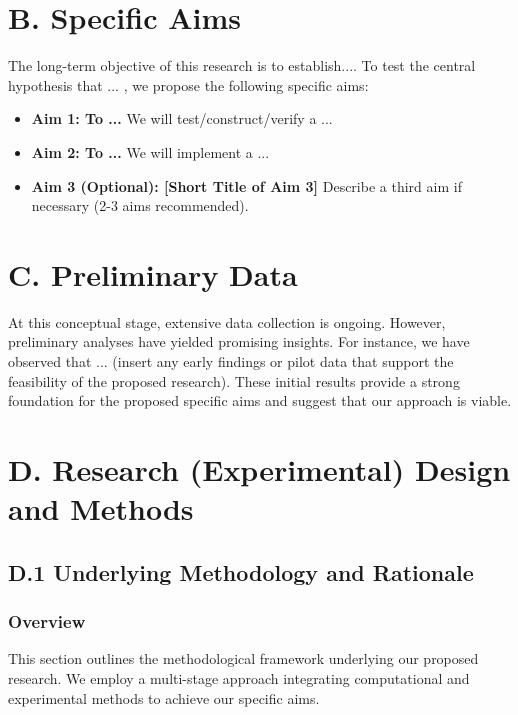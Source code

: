 \documentclass[12pt, a4paper]{article}
\begin{document}
\section*{B. Specific Aims}

The long-term objective of this research is to establish.... To test the central hypothesis that ... , we propose the following specific aims:

\begin{itemize}[leftmargin=*]
    \item \textbf{Aim 1: To ...} We will test/construct/verify a ...
    \item \textbf{Aim 2: To ...} We will implement a ...
    \item \textbf{Aim 3 (Optional): [Short Title of Aim 3]} Describe a third aim if necessary (2-3 aims recommended).
\end{itemize}

\section*{C. Preliminary Data}

At this conceptual stage, extensive data collection is ongoing. However, preliminary analyses have yielded promising insights. For instance, we have observed that ... (insert any early findings or pilot data that support the feasibility of the proposed research). These initial results provide a strong foundation for the proposed specific aims and suggest that our approach is viable.

\section*{D. Research (Experimental) Design and Methods}

\subsection*{D.1 Underlying Methodology and Rationale}
\subsubsection*{Overview}
This section outlines the methodological framework underlying our proposed research. We employ a multi-stage approach integrating computational and experimental methods to achieve our specific aims.
\end{document}
